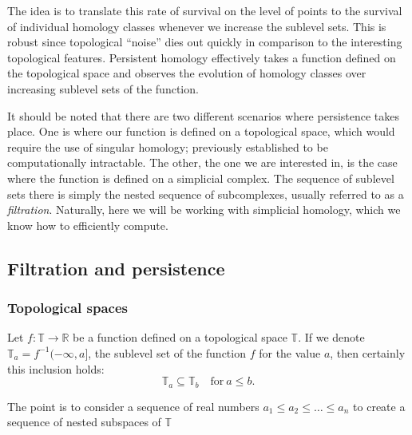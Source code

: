 The idea is to translate this rate of survival on the level of points to the survival of individual homology classes whenever we increase the sublevel sets. This is robust since topological ``noise'' dies out quickly in comparison to the interesting topological features. Persistent homology effectively takes a function defined on the topological space and observes the evolution of homology classes over increasing sublevel sets of the function.

It should be noted that there are two different scenarios where persistence takes place. One is where our function is defined on a topological space, which would require the use of singular homology; previously established to be computationally intractable. The other, the one we are interested in, is the case where the function is defined on a simplicial complex. The sequence of sublevel sets there is simply the nested sequence of subcomplexes, usually referred to as a \textit{filtration}. Naturally, here we will be working with simplicial homology, which we know how to efficiently compute.

\subsection{Filtration and persistence}
\subsubsection{Topological spaces}

Let $f: \mathbb{T} \to \mathbb{R}$ be a function defined on a topological space $\mathbb{T}$. If we denote $\mathbb{T}_{a} = f^{-1}(-\infty, a]$, the sublevel set of the function $f$ for the value $a$, then certainly this inclusion holds:
  \begin{equation*}
    \mathbb{T}_{a} \subseteq \mathbb{T}_{b} \quad \text{for}\: a \leq b.
  \end{equation*}

  The point is to consider a sequence of real numbers $a_{1} \leq a_{2} \leq \ldots \leq a_{n}$ to create a sequence of nested subspaces of $\mathbb{T}$

  \begin{figure}[h]
    \centering


  \end{figure}

